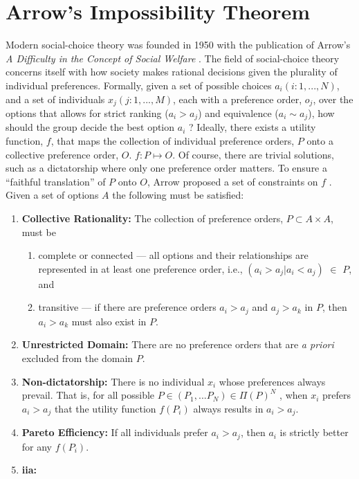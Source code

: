 \section{Arrow's Impossibility Theorem}
\label{section:arrows-thm}

Modern social-choice theory was founded in 1950 with the publication of Arrow's
\textit{A Difficulty in the Concept of Social Welfare}
\cite{arrow_difficulty_1950}. The field of social-choice theory concerns itself
with how society makes rational decisions given the plurality of individual
preferences. Formally, given a set of possible choices $a_i (i: 1,..., N)$, and
a set of individuals $x_j (j:1, ...,M)$, each with a preference order, $o_j$,
over the options that allows for strict ranking ($a_i > a_j$) and equivalence
($a_i \sim a_j$), how should the group decide the best option $a_i$
\cite{franssen_arrows_2005}? Ideally, there exists a utility function, $f$, that
maps the collection of individual preference orders, $P$ onto a collective
preference order, $O$. $f: P \mapsto O$. Of course, there are trivial solutions,
such as a dictatorship where only one preference order matters. To ensure a
``faithful translation'' of $P$ onto $O$, Arrow proposed a set of constraints on
$f$ \cite{arrow_difficulty_1950,franssen_arrows_2005}. Given a set of options
$A$ the following must be satisfied:
\begin{enumerate}
    \item \textbf{Collective Rationality:} The collection of preference orders,
    $P \subset A\times A$, must be
    \begin{enumerate}
        \item complete or connected --- all options and their relationships are
        represented in at least one preference order, i.e., $(a_i > a_j | a_i <
        a_j)$ $\in$ $P$, and
        \item transitive --- if there are preference orders $a_i > a_j$ and $a_j
        > a_k$ in $P$, then $a_i > a_k$ must also exist in $P$.
    \end{enumerate}
    \item \textbf{Unrestricted Domain:} There are no preference orders that are
    \textit{a priori} excluded from the domain $P$.
    \item \textbf{Non-dictatorship:} There is no individual $x_i$ whose
    preferences always prevail. That is, for all possible $P \in (P_1, ... P_N)
    \in \Pi(P)^N$ , when $x_i$ prefers $a_i > a_j$ that the utility function
    $f(P_i)$ always results in $a_i > a_j$.
    \item \textbf{Pareto Efficiency:} If all individuals prefer $a_i > a_j$,
    then $a_i$ is strictly better for any $f(P_i)$.
    \item \textbf{\ac{iia}:}
\end{enumerate}

